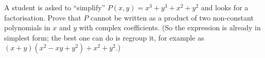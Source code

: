 A student is asked to ``simplify'' $P(x,y)=x^3+y^3+x^2+y^2$ and looks for a factorisation. Prove that $P$ cannot be written as a product of two non-constant polynomials in $x$ and $y$ with complex coefficients. (So the expression is already in simplest form; the best one can do is regroup it, for example as $(x+y)\left(x^2-xy+y^2\right)+x^2+y^2$.)
